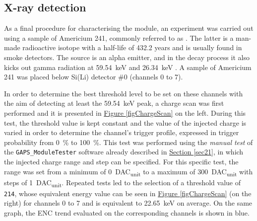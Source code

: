 \subsection{X-ray detection}
\par
As a final procedure for characterising the module, an experiment was carried out using a sample of Americium 241, commonly referred to as .  The latter is a man-made radioactive isotope with a half-life of 432.2 years and is usually found in smoke detectors. The source is an alpha emitter, and in the decay process it also kicks out gamma radiation at \SI{59.54}{\kilo\electronvolt} and \SI{26.34}{\kilo\electronvolt} \cite{agencyfortoxicsubstancesanddiseaseregistry_2004_chemical}. A sample of Americium 241 was placed below Si(Li) detector \#0 (channels 0 to 7). 

\par
In order to determine the best threshold level to be set on these channels with the aim of detecting at least the \SI{59.54}{\kilo\electronvolt} peak, a charge scan was first performed and it is presented in \hyperref[figChargeScan]{Figure \ref{figChargeScan}} on the left. During this test, the threshold value is kept constant and the value of the injected charge is varied in order to determine the channel's trigger profile, expressed in trigger probability from \SI{0}{\percent} to \SI{100}{\percent}. This test was performed using the \textit{manual test} of the \texttt{GAPS\_ModuleTester} software already described in \hyperref[sec21]{Section \ref{sec21}}, in which the injected charge range and step can be specified. For this specific test, the range was set from a minimum of \SI{0}{DAC_{unit}} to a maximum of \SI{300}{DAC_{unit}} with steps of \SI{1}{DAC_{unit}}. Repeated tests led to the selection of a threshold value of \texttt{214}, whose equivalent energy value can be seen in \hyperref[figChargeScan]{Figure \ref{figChargeScan}} (on the right) for channels 0 to 7 and is equivalent to \SI{22.65}{\kilo\electronvolt} on average. On the same graph, the ENC trend evaluated on the corresponding channels is shown in blue. 

